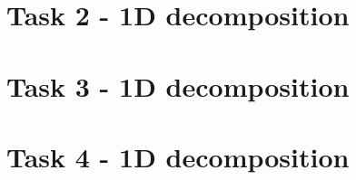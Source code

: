 \documentclass[11pt,a4paper]{article}
\begin{document}
\newpage
\section{Task 2 - 1D decomposition}

\newpage
\section{Task 3 - 1D decomposition}

\newpage
\section{Task 4 - 1D decomposition}
\end{document}
